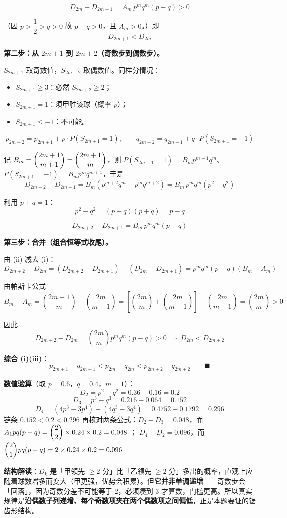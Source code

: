 \[D_{2m}-D_{2m+1}=A_m\,p^mq^m(p-q)>0\]

（因 $p>\dfrac12>q>0$ 故 $p-q>0$，且 $A_m>0$。）即
\[\boxed{D_{2m+1}<D_{2m}}\tag{i}\]

\par\medskip

\textbf{第二步：从 $2m+1$ 到 $2m+2$（奇数步到偶数步）。}

$S_{2m+1}$ 取奇数值，$S_{2m+2}$ 取偶数值。同样分情况：

\begin{itemize}
\item $S_{2m+1}\ge3$：必然 $S_{2m+2}\ge2$；
\item $S_{2m+1}=1$：须甲胜该球（概率 $p$）；
\item $S_{2m+1}\le-1$：不可能。
\end{itemize}

\[p_{2m+2}=p_{2m+1}+p\cdot P\left(S_{2m+1}=1\right),\qquad q_{2m+2}=q_{2m+1}+q\cdot P\left(S_{2m+1}=-1\right)\]

记 $B_m=\dbinom{2m+1}{m+1}=\dbinom{2m+1}{m}$，则 $P\left(S_{2m+1}=1\right)=B_mp^{m+1}q^m$、$P\left(S_{2m+1}=-1\right)=B_mp^mq^{m+1}$，于是
\[D_{2m+2}-D_{2m+1}=B_m\left(p^{m+2}q^m-p^mq^{m+2}\right)=B_m\,p^mq^m\left(p^2-q^2\right)\]

利用 $p+q=1$：
\[p^2-q^2=(p-q)(p+q)=p-q\]

\[D_{2m+2}-D_{2m+1}=B_m\,p^mq^m(p-q)\tag{ii}\]

\par\medskip

\textbf{第三步：合并（组合恒等式收尾）。}

由 (ii) 减去 (i)：
\[D_{2m+2}-D_{2m}=\left(D_{2m+2}-D_{2m+1}\right)-\left(D_{2m}-D_{2m+1}\right)=p^mq^m(p-q)\left(B_m-A_m\right)\]

由帕斯卡公式
\[B_m-A_m=\binom{2m+1}{m}-\binom{2m}{m-1}=\left[\binom{2m}{m}+\binom{2m}{m-1}\right]-\binom{2m}{m-1}=\binom{2m}{m}>0\]

因此
\[D_{2m+2}-D_{2m}=\binom{2m}{m}p^mq^m(p-q)>0\ \Longrightarrow\ \boxed{D_{2m}<D_{2m+2}}\tag{iii}\]

\textbf{综合 (i)(iii)}：
\[p_{2m+1}-q_{2m+1}<p_{2m}-q_{2m}<p_{2m+2}-q_{2m+2}\qquad\blacksquare\]

\begin{gktip}
\textbf{数值验算}（取 $p=0.6$，$q=0.4$，$m=1$）：
\[D_2=p^2-q^2=0.36-0.16=0.2\]
\[D_3=p^3-q^3=0.216-0.064=0.152\]
\[D_4=\left(4p^3-3p^4\right)-\left(4q^3-3q^4\right)=0.4752-0.1792=0.296\]
链条 $0.152<0.2<0.296$ 
再核对两条公式：$D_2-D_3=0.048$，而 $A_1p q(p-q)=\dbinom22\times0.24\times0.2=0.048$ ；
$D_4-D_2=0.096$，而 $\dbinom21pq(p-q)=2\times0.24\times0.2=0.096$ 

\textbf{结构解读}：$D_k$ 是「甲领先 $\ge2$ 分」比「乙领先 $\ge2$ 分」多出的概率，直观上应随着球数增多而变大（甲更强，优势会积累）。但\textbf{它并非单调递增}——奇数步会「回落」，因为奇数分差不可能等于 $2$，必须凑到 $3$ 才算数，门槛更高。所以真实规律是\textbf{沿偶数子列递增、每个奇数项夹在两个偶数项之间偏低}，正是本题要证的锯齿形结构。
\end{gktip}

